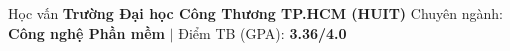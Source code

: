 \begin{rubric}{Học vấn}
\entry*[2022 -- 2026]%
	\textbf{Trường Đại học Công Thương TP.HCM (HUIT)}
	\newline Chuyên ngành: \textbf{Công nghệ Phần mềm} $|$ Điểm TB (GPA): \textbf{3.36/4.0}
\end{rubric}
